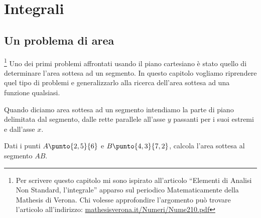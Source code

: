 


% 

\chapter{Integrali} 

\section{Un problema di area}
\label{sec:integrali_area}

\footnote{Per scrivere questo capitolo mi sono ispirato 
all'articolo ``Elementi di Analisi Non Standard, l'integrale'' apparso sul 
periodico Matematicamente della Mathesis di Verona. 
Chi volesse approfondire l'argomento può trovare l'articolo 
all'indirizzo: 
\href{http://mathesisverona.it/Numeri/Nume210.pdf}
     {mathesisverona.it/Numeri/Nume210.pdf}}
Uno dei primi problemi affrontati usando il piano cartesiano è stato quello 
di determinare l'area sottesa ad un segmento. In questo capitolo vogliamo 
riprendere quel tipo di problemi e generalizzarlo alla ricerca dell'area 
sottesa ad una funzione qualsiasi.

Quando diciamo area sottesa ad un segmento intendiamo la parte di piano 
delimitata dal segmento, dalle rette parallele all'asse \(y\) passanti per i 
suoi estremi e dall'asse \(x\).

\begin{esempio}
Dati i punti \(A \punto{2,5}{6}\) e \(B \punto{4,3}{7,2}\), calcola 
l'area 
sottesa al segmento \(AB\).

\end{esempio}

